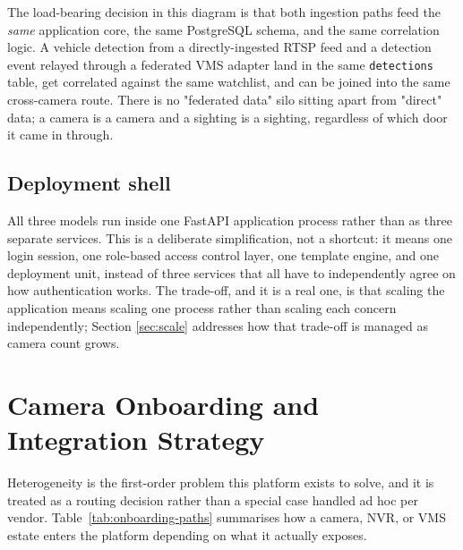 \documentclass[11pt,a4paper]{article}
\begin{document}
The load-bearing decision in this diagram is that both ingestion paths feed
the \emph{same} application core, the same PostgreSQL schema, and the same
correlation logic. A vehicle detection from a directly-ingested RTSP feed
and a detection event relayed through a federated VMS adapter land in the
same \texttt{detections} table, get correlated against the same watchlist,
and can be joined into the same cross-camera route. There is no "federated
data" silo sitting apart from "direct" data; a camera is a camera and a
sighting is a sighting, regardless of which door it came in through.

\subsection{Deployment shell}

All three models run inside one FastAPI application process rather than as
three separate services. This is a deliberate simplification, not a
shortcut: it means one login session, one role-based access control layer,
one template engine, and one deployment unit, instead of three services
that all have to independently agree on how authentication works. The
trade-off, and it is a real one, is that scaling the application means
scaling one process rather than scaling each concern independently; Section
\ref{sec:scale} addresses how that trade-off is managed as camera count
grows.

\section{Camera Onboarding and Integration Strategy}
\label{sec:integration}

Heterogeneity is the first-order problem this platform exists to solve, and
it is treated as a routing decision rather than a special case handled ad
hoc per vendor. Table~\ref{tab:onboarding-paths} summarises how a camera,
NVR, or VMS estate enters the platform depending on what it actually
exposes.
\end{document}
